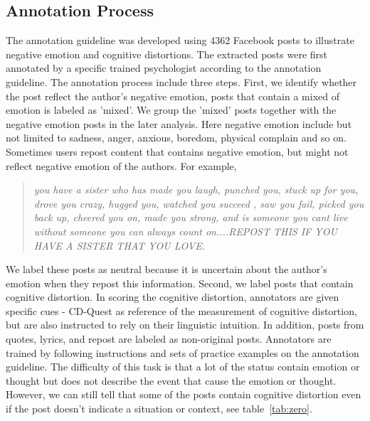 \subsection{Annotation Process}

The annotation guideline was developed using 4362 Facebook posts to illustrate negative emotion and cognitive distortions.  The extracted posts were first annotated by a specific trained psychologist according to the annotation guideline. The annotation process include three steps. First, we identify whether the post reflect the author's negative emotion, posts that contain a mixed of emotion is labeled as 'mixed'. We group the 'mixed' posts together with the negative emotion posts in the later analysis. Here negative emotion include but not limited to sadness, anger, anxious, boredom, physical complain and so on. Sometimes users repost content that contains negative emotion, but might not reflect negative emotion of the authors.  For example, 

\begin{quote}{\itshape}
\textit{you have a sister who has made you laugh, punched you, stuck up for you, drove you crazy, hugged you, watched you succeed , saw you fail, picked you back up, cheered you on, made you strong, and is someone you cant live without  someone you can always count on....REPOST THIS IF YOU HAVE A SISTER THAT YOU LOVE.}
\end{quote}

We label these posts as neutral because it is uncertain about the author's emotion when they repost this information. Second, we label posts that contain cognitive distortion. In scoring the cognitive distortion, annotators are given specific cues - CD-Quest as reference of the measurement of cognitive distortion, but are also instructed to rely on their linguistic intuition. In addition, posts from quotes, lyrics, and repost are labeled as non-original posts.  Annotators are trained by following instructions and sets of practice examples on the annotation guideline. The difficulty of this task is that a lot of the status contain emotion or thought but does not describe the event that cause the emotion or thought. However, we can still tell that some of the posts contain cognitive distortion even if the post doesn't indicate a situation or context, see table~\ref{tab:zero}. 

